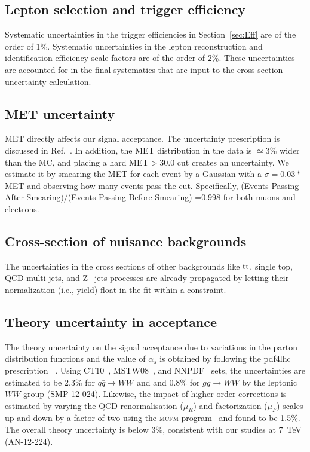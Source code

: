 \subsection{Lepton selection and trigger efficiency}
\label{sec:LeptonSelectionAndTriggerEfficiency}
Systematic uncertainties in the trigger efficiencies in
Section~\ref{sec:Eff} are of the order of 1\%. Systematic
uncertainties in the lepton reconstruction and identification
efficiency scale factors are of the order of 2\%. These uncertainties
are accounted for in the final systematics that are input to the
cross-section uncertainty calculation.
\subsection{MET uncertainty}
MET directly affects our signal acceptance. 
The uncertainty prescription is discussed in Ref.~\cite{met}.
In addition, the MET distribution in the data is $\simeq$3\% wider 
than the MC, and placing a hard MET$>30.0$ cut creates an uncertainty. 
We estimate it by smearing the MET for each event by a Gaussian with 
a $\sigma =0.03*$MET and observing how many events pass the cut. 
Specifically, (Events Passing After Smearing)/(Events Passing Before Smearing) 
=0.998 for both muons and electrons.
\subsection{Cross-section of nuisance backgrounds}
The uncertainties in the cross sections of other backgrounds 
like $\mathrm{t}\bar{\mathrm{t}}$,  single top, QCD multi-jets, and Z+jets processes 
are already propagated by letting their normalization (i.e., yield) 
float in the fit within a constraint.

\subsection{Theory uncertainty in acceptance}
The theory uncertainty on the signal acceptance due to variations in the parton distribution functions and the
value of $\alpha_{s}$ is obtained by following the {\sc pdf4lhc} prescription ~\cite{Botje:2011sn}.
Using \textsc{CT10}~\cite{ct10}, \textsc{MSTW08}~\cite{Martin:2009iq}, and \textsc{NNPDF}~\cite{nnpdf} sets, the uncertainties are estimated to be 2.3\% 
for $q\bar{q} \to WW$ and and 0.8\% for $gg \to WW$ by the leptonic $WW$ group (SMP-12-024).
Likewise, the impact of higher-order corrections is estimated by varying the QCD renormalisation
($\mu_R$) and factorization ($\mu_F$) scales up and down by a factor of two using the \textsc{mcfm} program~\cite{MCFMarticle} and found to be 1.5\%. 
The overall theory uncertainty is below 3\%, consistent with our studies at 7~TeV (AN-12-224).




